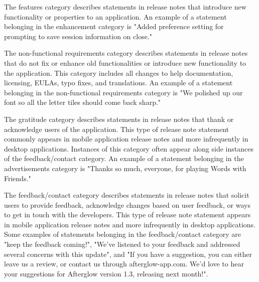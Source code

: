 \documentclass{acm_proc_article-sp}
\begin{document}
The features category describes statements in release notes that  introduce new functionality or properties to an application.
An example of a statement belonging in the enhancement category is "Added preference setting for prompting to save session information on close."

The non-functional requirements category describes statements in release notes that do not fix or enhance old functionalities or introduce new functionality to the application.
This category includes all changes to help documentation, licensing, EULAs, typo fixes, and translations.
An example of a statement belonging in the non-functional requirements category is "We polished up our font so all the letter tiles should come back sharp."


The gratitude category describes statements in release notes that thank or acknowledge users of the application.
This type of release note statement commonly appears in mobile application release notes and more infrequently in desktop applications.
Instances of this category often appear along side instances of the feedback/contact category.
An example of a statement belonging in the advertisements category is "Thanks so much, everyone, for playing Words with Friends."

The feedback/contact category describes statements in release notes that solicit users to provide feedback, acknowledge changes based on user feedback, or ways to get in touch with the developers.
This type of release note statement appears in mobile application release notes and more infrequently in desktop applications.
Some examples of statements belonging in the feedback/contact category are "keep the feedback coming!", "We've listened to your feedback and addressed several concerns with this update", and  "If you have a suggestion, you can either leave us a review, or contact us through afterglow-app.com. We'd love to hear your suggestions for Afterglow version 1.3, releasing next month!".
\end{document}
